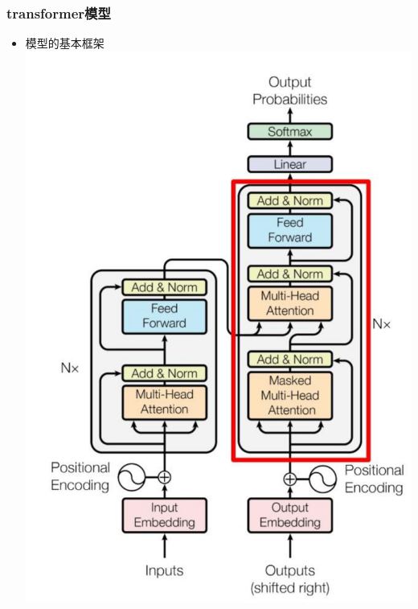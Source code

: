 \documentclass[t]{beamer}
\begin{document}
\begin{CJK*}{UTF8}{gkai}
\begin{frame}
	\frametitle{transformer模型}
    \begin{itemize}
		\item 模型的基本框架\\
		\includegraphics[scale=0.1]{png/tranformer.png}
		\end{itemize}
\end{frame}



\end{CJK*}
\end{document}
